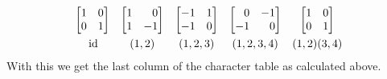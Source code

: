 \begin{example}
  \[
    \begin{array}{ccccc}
        \begin{bmatrix*}[r]
          1 & 0 \\
          0 & 1
        \end{bmatrix*}
      & \begin{bmatrix*}[r]
          1 &  0  \\
          1 & -1
        \end{bmatrix*}
      & \begin{bmatrix*}[r]
          -1  & 1 \\
          -1  & 0
        \end{bmatrix*}
      & \begin{bmatrix*}[r]
           0  & -1 \\
          -1  &  0
        \end{bmatrix*}
      & \begin{bmatrix*}[r]
          1 & 0 \\
          0 & 1
        \end{bmatrix*}
      \\
        \rule{0pt}{1.2em}
        \id
      & (1,2)
      & (1,2,3)
      & (1,2,3,4)
      & (1,2)(3,4)
    \end{array}
  \]
  With this we get the last column of the character table as calculated above.
\end{example}


